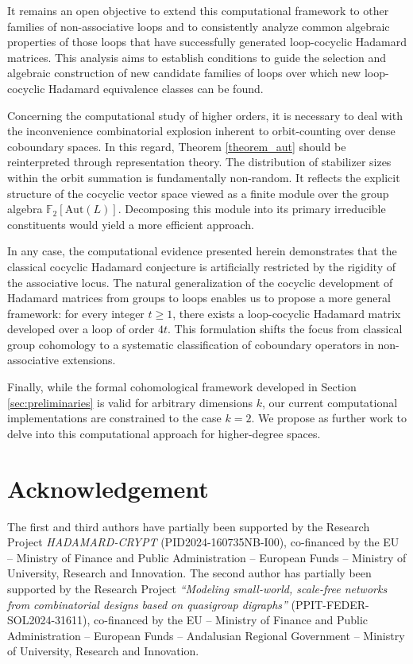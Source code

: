 \documentclass[11pt,a4paper]{article}
\begin{document}
It remains an open objective to extend this computational framework to other families of non-associative loops and to consistently analyze common algebraic properties of those loops that have successfully generated loop-cocyclic Hadamard matrices. This analysis aims to establish conditions to guide the selection and algebraic construction of new candidate families of loops over which new loop-cocyclic Hadamard equivalence classes can be found.

Concerning the computational study of higher orders, it is necessary to deal with the inconvenience combinatorial explosion inherent to orbit-counting over dense coboundary spaces. In this regard, Theorem \ref{theorem_aut} should be reinterpreted through representation theory. The distribution of stabilizer sizes within the orbit summation is fundamentally non-random. It reflects the explicit structure of the cocyclic vector space viewed as a finite module over the group algebra $\mathbb{F}_2[\text{Aut}(L)]$. Decomposing this module into its primary irreducible constituents would yield a more efficient approach.

In any case, the computational evidence presented herein demonstrates that the classical cocyclic Hadamard conjecture is artificially restricted by the rigidity of the associative locus. The natural generalization of the cocyclic development of Hadamard matrices from groups to loops enables us to propose a more general framework: for every integer $t \ge 1$, there exists a loop-cocyclic Hadamard matrix developed over a loop of order $4t$. This formulation shifts the focus from classical group cohomology to a systematic classification of coboundary operators in non-associative extensions.

Finally, while the formal cohomological framework developed in Section \ref{sec:preliminaries} is valid for arbitrary dimensions $k$, our current computational implementations are constrained to the case $k=2$. We propose as further work to delve into this computational approach for higher-degree spaces.

\section*{Acknowledgement}

The first and third authors have partially been supported by the Research Project {\em HADAMARD-CRYPT} (PID2024-160735NB-I00), co-financed by the EU -- Ministry of Finance and Public Administration -- European Funds -- Ministry of University, Research and Innovation. The second author has partially been supported by the Research Project {\em ``Modeling small-world, scale-free networks from combinatorial designs based on quasigroup digraphs''} (PPIT-FEDER-SOL2024-31611), co-financed by the EU -- Ministry of Finance and Public Administration -- European Funds -- Andalusian Regional Government -- Ministry of University, Research and Innovation.
\end{document}
